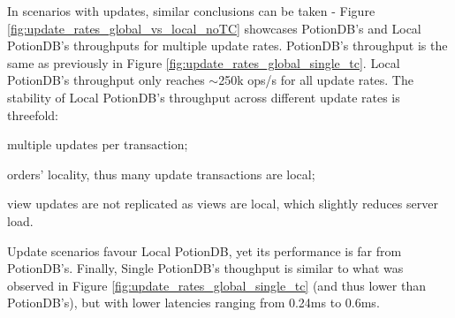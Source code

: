 \documentclass[sigconf, nonacm]{acmart}
\begin{document}
In scenarios with updates, similar conclusions can be taken - Figure \ref{fig:update_rates_global_vs_local_noTC} showcases PotionDB's and Local PotionDB's throughputs for multiple update rates.
PotionDB's throughput is the same as previously in Figure \ref{fig:update_rates_global_single_tc}.
Local PotionDB's throughput only reaches $\sim$250k ops/s for all update rates.
The stability of Local PotionDB's throughput across different update rates is threefold:
\begin{enumerate*}[label=(\roman*)]
	\item multiple updates per transaction;%
	\item orders' locality, thus many update transactions are local;
	\item view updates are not replicated as views are local, which slightly reduces server load. %
\end{enumerate*} %
Update scenarios favour Local PotionDB, yet its performance is far from PotionDB's.
Finally, Single PotionDB's thoughput is similar to what was observed in Figure \ref{fig:update_rates_global_single_tc} (and thus lower than PotionDB's), but with lower latencies ranging from 0.24ms to 0.6ms.
\end{document}
